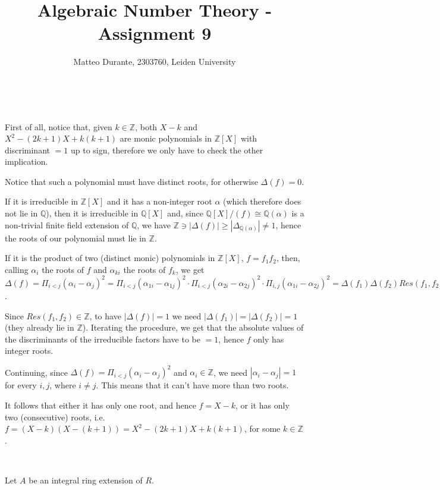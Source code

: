 \documentclass{article}
\newcommand{\numberset}{\mathbb}
\newcommand{\Z}{\numberset{Z}}
\newcommand{\Q}{\numberset{Q}}
\newcommand{\exercise}[1]{\noindent {\bf Exercise #1}}
\begin{document}
\title{Algebraic Number Theory - Assignment 9}

\author{Matteo Durante, 2303760, Leiden University}

\maketitle

~\\
\exercise{14}

First of all, notice that, given $k\in\Z$, both $X-k$ and $X^2-(2k+1)X+k(k+1)$ are monic polynomials in $\Z[X]$ with discriminant $=1$ up to sign, therefore we only have to check the other implication.

Notice that such a polynomial must have distinct roots, for otherwise $\Delta(f)=0$.

If it is irreducible in $\Z[X]$ and it has a non-integer root $\alpha$ (which therefore does not lie in $\Q$), then it is irreducible in $\Q[X]$ and, since $\Q[X]/(f)\cong\Q(\alpha)$ is a non-trivial finite field extension of $\Q$, we have $\Z\ni|\Delta(f)|\geq|\Delta_{\Q(\alpha)}|\neq 1$, hence the roots of our polynomial must lie in $\Z$.

If it is the product of two (distinct monic) polynomials in $\Z[X]$, $f=f_1f_2$, then, calling $\alpha_i$ the roots of $f$ and $\alpha_{ki}$ the roots of $f_k$, we get $\Delta(f)=\Pi_{i<j} (\alpha_i-\alpha_j)^2=\Pi_{i<j} (\alpha_{1i}-\alpha_{1j})^2\cdot\Pi_{i<j} (\alpha_{2i}-\alpha_{2j})^2\cdot\Pi_{i,j} (\alpha_{1i}-\alpha_{2j})^2=\Delta(f_1)\Delta(f_2)Res(f_1,f_2)^2$.

Since $Res(f_1,f_2)\in\Z$, to have $|\Delta(f)|=1$ we need $|\Delta(f_1)|=|\Delta(f_2)|=1$ (they already lie in $\Z$). Iterating the procedure, we get that the absolute values of the discriminants of the irreducible factors have to be $=1$, hence $f$ only has integer roots.

Continuing, since $\Delta(f)=\Pi_{i<j} (\alpha_i-\alpha_j)^2$ and $\alpha_i\in\Z$, we need $|\alpha_i-\alpha_j|=1$ for every $i,j$, where $i\neq j$. This means that it can't have more than two roots.

It follows that either it has only one root, and hence $f=X-k$, or it has only two (consecutive) roots, i.e. $f=(X-k)(X-(k+1))=X^2-(2k+1)X+k(k+1)$, for some $k\in\Z$.


~\\
\exercise{20}

Let $A$ be an integral ring extension of $R$.
\end{document}
